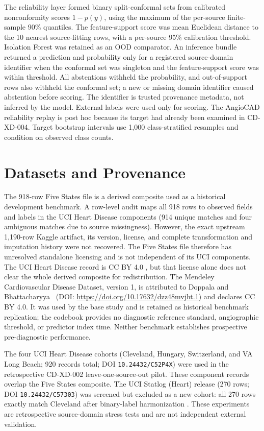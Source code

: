\documentclass[12pt]{article}
\begin{document}
The reliability layer formed binary split-conformal sets from calibrated
nonconformity scores \(1-p(y)\), using the maximum of the per-source
finite-sample 90\% quantiles. The feature-support score was mean Euclidean
distance to the 10 nearest source-fitting rows, with a per-source 95\%
calibration threshold. Isolation Forest was retained as an OOD comparator. An
inference bundle returned a prediction and probability only for a registered
source-domain identifier when the conformal set was singleton and the
feature-support score was within threshold. All abstentions withheld the
probability, and out-of-support rows also withheld the conformal set; a new or
missing domain identifier caused abstention before scoring. The identifier is
trusted provenance metadata, not inferred by the model. External labels were
used only for scoring. The AngioCAD reliability replay is post hoc because its target had
already been examined in CD-XD-004. Target bootstrap intervals use 1,000
class-stratified resamples and condition on observed class counts.

\section{Datasets and Provenance}
The 918-row Five States file is a derived composite used as a historical
development benchmark. A row-level audit maps all 918 rows to observed fields
and labels in the UCI Heart Disease components (914 unique matches and four
ambiguous matches due to source missingness). However, the exact upstream
1,190-row Kaggle artifact, its version, license, and complete transformation
and imputation history were not recovered. The Five States file therefore has
unresolved standalone licensing and is not independent of its UCI components.
The UCI Heart Disease record is CC BY 4.0 \cite{ucihd}, but that license alone
does not clear the whole derived composite for redistribution. The Mendeley
Cardiovascular Disease Dataset, version 1, is attributed to Doppala and
Bhattacharyya~\cite{doppala2021dataset} (DOI:
\url{https://doi.org/10.17632/dzz48mvjht.1}) and declares CC BY 4.0. It was
used by the base study and is retained as historical benchmark replication;
the codebook provides no diagnostic reference standard, angiographic
threshold, or predictor index time. Neither benchmark establishes prospective
pre-diagnostic performance.

The four UCI Heart Disease cohorts (Cleveland, Hungary, Switzerland, and VA
Long Beach; 920 records total; DOI \texttt{10.24432/C52P4X}) were used in the
retrospective CD-XD-002 leave-one-source-out pilot. These component records
overlap the Five States composite. The UCI Statlog (Heart) release (270 rows;
DOI \texttt{10.24432/C57303}) was screened but excluded as a new cohort: all
270 rows exactly match Cleveland after binary-label harmonization
\cite{ucistatlog}. These experiments
are retrospective source-domain stress tests and are not independent external
validation.
\end{document}

